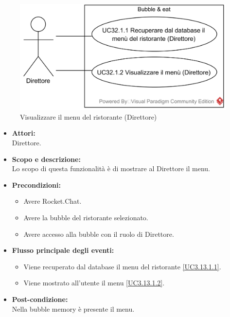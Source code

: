 \begin{samepage}
\nopagebreak
\begin{figure}[H]
	\centering
	\includegraphics[width=15cm]{../../documenti/AnalisiDeiRequisiti/Diagrammi_img/usecase/uc3_13_1.png}
	\caption{\UCFCaption{} Visualizzare il menu del ristorante (Direttore)}
\end{figure}
\end{samepage}


\begin{itemize}
	\item \textbf{Attori:}
	\\Direttore.
	\item \textbf{Scopo e descrizione:} 
	\\Lo scopo di questa funzionalità è di mostrare al Direttore il menu.
	\item \textbf{Precondizioni:}
	\begin{itemize}
		\item Avere Rocket.Chat.
		\item Avere la bubble del ristorante selezionato.
		\item Avere accesso alla bubble con il ruolo di Direttore.
	\end{itemize}
	\item \textbf{Flusso principale degli eventi:}
	\begin{itemize}
		\item Viene recuperato dal database il menu del ristorante \ref{UC3.13.1.1}.
		\item Viene mostrato all'utente il menu \ref{UC3.13.1.2}.
	\end{itemize}
	\item \textbf{Post-condizione:}
	\\Nella bubble memory è presente il menu.
\end{itemize}

